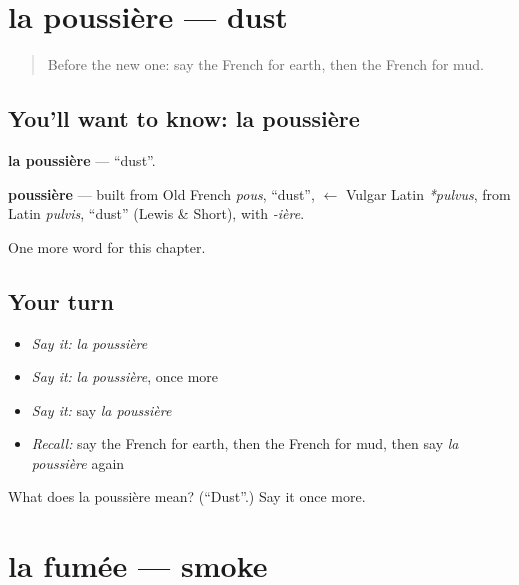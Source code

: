 \section[la poussière]{la poussière — dust}

\label{lesson:FR-C201-poussiere}



\begin{quote}
Before the new one: say the French for earth, then the French for mud.
\end{quote}

\subsection*{You'll want to know: la poussière}
\textbf{la poussière} — \textquotedblleft{}dust\textquotedblright{}.

\begin{cousinweb}
\textbf{poussière} — built from Old French \emph{pous}, \textquotedblleft{}dust\textquotedblright{}, $\leftarrow$ Vulgar Latin \emph{*pulvus}, from Latin \emph{pulvis}, \textquotedblleft{}dust\textquotedblright{} (Lewis \& Short), with \emph{-ière}.
\end{cousinweb}

\begin{grammarlens}[title={What you've built}]
One more word for this chapter.
\end{grammarlens}

\subsection*{Your turn}
\begin{itemize}
\raggedright
  \item \emph{Say it:} \emph{la poussière}
  \item \emph{Say it:} \emph{la poussière}, once more
  \item \emph{Say it:} say \emph{la poussière}
  \item \emph{Recall:} say the French for earth, then the French for mud, then say \emph{la poussière} again
\end{itemize}

\begin{tcolorbox}[breakable,colback=teal!4,colframe=teal!35!black,title={Before you move on}]
What does la poussière mean? (\textquotedblleft{}Dust\textquotedblright{}.) Say it once more.
\end{tcolorbox}
\section[la fumée]{la fumée — smoke}

